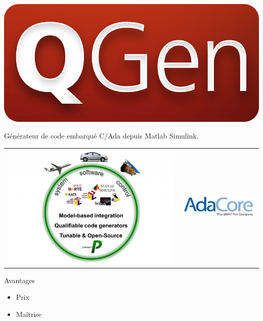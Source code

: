 \documentclass[xcolor=x11names,compress]{beamer}
\begin{document}
\begin{frame}{\vspace{-17pt}\\\includegraphics[scale=0.05]{images/qgen}}
  \begin{center}
	Générateur de code embarqué C/Ada depuis Matlab Simulink.\\
	\vfill
	\begin{tabular}[h]{m{150pt}m{150pt}}
	  \includegraphics[scale=0.14]{images/projectp}&
	  \includegraphics[scale=0.24]{images/adacore.png}\\
	\end{tabular}
	\vfill
	\begin{block}{Avantages}{}
	  \begin{itemize}
		\item Prix
		\item Maîtrise
	  \end{itemize}
	\end{block}
  \end{center}
\end{frame}
\end{document}
